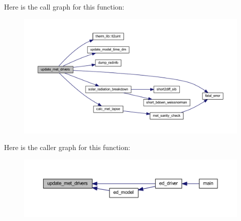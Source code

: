 Here is the call graph for this function\+:\nopagebreak
\begin{figure}[H]
\begin{center}
\leavevmode
\includegraphics[width=350pt]{ed__met__driver_8f90_a733afbe45244033876caaa6e09cb053c_cgraph}
\end{center}
\end{figure}




Here is the caller graph for this function\+:\nopagebreak
\begin{figure}[H]
\begin{center}
\leavevmode
\includegraphics[width=350pt]{ed__met__driver_8f90_a733afbe45244033876caaa6e09cb053c_icgraph}
\end{center}
\end{figure}


